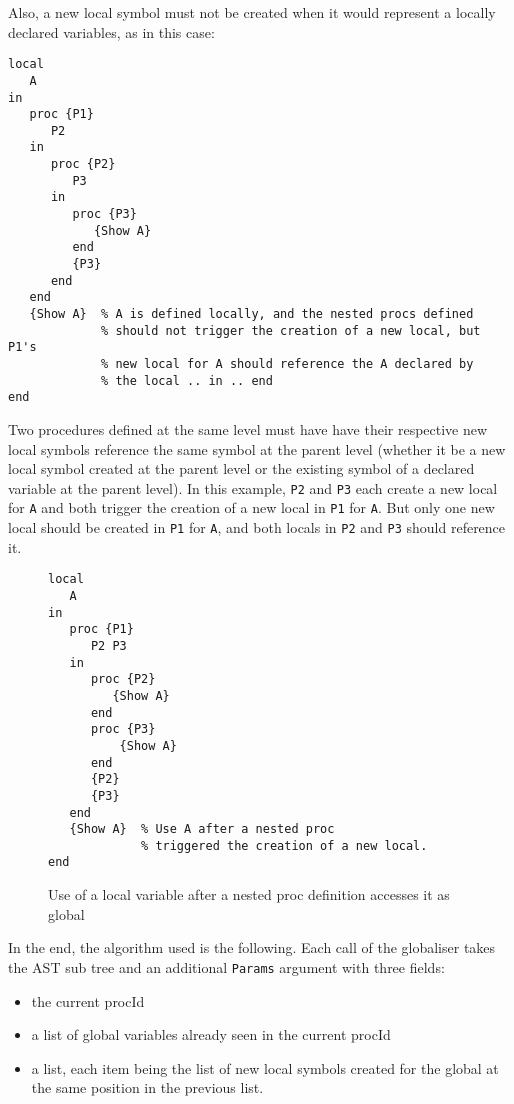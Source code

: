 \documentclass[a4paper]{memoir}
\begin{document}
Also, a new local symbol must not be created when it would represent a locally declared variables, as in this case:

\begin{lstlisting}
local
   A
in
   proc {P1}
      P2
   in
      proc {P2}
         P3
      in
         proc {P3}
            {Show A}
         end
         {P3}
      end
   end
   {Show A}  % A is defined locally, and the nested procs defined 
             % should not trigger the creation of a new local, but P1's
             % new local for A should reference the A declared by 
             % the local .. in .. end
end
\end{lstlisting}

Two procedures defined at the same level must have have their respective new local symbols reference the same symbol at the parent level (whether it be a new local symbol created at the parent level or the existing symbol of a declared variable at the parent level). In this example, \lstinline!P2! and \lstinline!P3! each create a new local for \lstinline!A! and both trigger the creation of a new local in \lstinline!P1! for \lstinline!A!. But only one new local should be created in \lstinline!P1! for \lstinline!A!, and both locals in \lstinline!P2! and \lstinline!P3! should reference it.


\begin{figure}[h]
\begin{lstlisting}
local
   A
in
   proc {P1}
      P2 P3
   in
      proc {P2}
         {Show A}
      end
      proc {P3}
          {Show A}
      end
      {P2}
      {P3}
   end
   {Show A}  % Use A after a nested proc 
             % triggered the creation of a new local.
end
\end{lstlisting}
\caption{Use of a local variable after a nested proc definition accesses it as
global}
\label{fig:globaliser:examplev}
\end{figure}


In the end, the algorithm used is the following.
Each call of the globaliser takes the AST sub tree and an additional \lstinline!Params! argument with three fields:
\begin{itemize}
   \item the current procId
   \item a list of global variables already seen in the current procId
   \item a list, each item being the list of new local symbols created for the
     global at the same position in the previous list.
\end{itemize}
\end{document}
